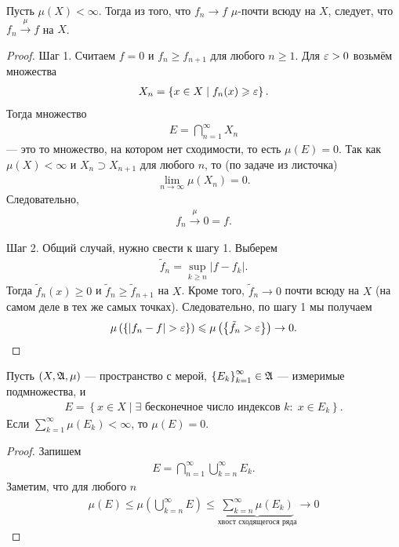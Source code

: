 \begin{thm}
 Пусть $\mu(X) < \infty$. Тогда из того, что $f_n \to f$ $\mu$-почти всюду на $X$, следует, что $f_n \xrightarrow{\mu} f$ на $X$.
\end{thm}
\begin{proof}
 Шаг 1. Считаем $f = 0$ и $f_n \geqslant f_{n+1}$ для любого $n \geqslant 1$. Для $\varepsilon > 0$ возьмём множества \begin{align*}
  X_n = \left\{ x \in X \mid f_n(x) \geqslant \varepsilon \right\}
 .\end{align*} Тогда множество \begin{align*}
  E = \bigcap_{n=1}^{\infty} X_n 
  \end{align*} --- это то множество, на котором нет сходимости, то есть $\mu(E) = 0$. Так как  $\mu(X) < \infty$ и $X_n \supset X_{n+1}$ для любого $n$, то (по задаче из листочка) \begin{align*}
  \lim_{n \to \infty} \mu(X_n)  = 0
 .\end{align*} Следовательно, \begin{align*}
 f_n \xrightarrow{\mu} 0 = f
 .\end{align*} 

 Шаг 2. Общий случай, нужно свести к шагу 1. Выберем  \begin{align*}
  \tilde f_n = \sup_{k \geqslant n} \left| f - f_k \right|
 .\end{align*} Тогда $\tilde f_n(x) \geqslant 0$ и $\tilde f_n \geqslant \tilde f_{n+1}$ на $X$. Кроме того,  $\tilde f_n \to 0$ почти всюду на $X$ (на самом деле в тех же самых точках). Следовательно, по шагу 1 мы получаем 
\begin{align*}
\mu \left( \left\{ \left| f_n - f \right| > \varepsilon \right\} \right) \leqslant \mu \left( \left\{ \tilde f_n > \varepsilon \right\} \right) \to 0
.\end{align*}
\end{proof}
\begin{lm}
 \label{lemma:borel-cantelli}
 Пусть $(X, \mathfrak{A}, \mu)$ --- пространство с мерой, $\left\{ E_k \right\}_{k=1}^{\infty} \in \mathfrak{A}$ --- измеримые подмножества, и \begin{align*}
  E = \left\{ x \in X \mid \exists \text{ бесконечное число индексов } k  \colon\; x \in E_k \right\}
 .\end{align*} Если $\sum_{k=1}^{\infty} \mu(E_k) < \infty$, то $\mu(E) = 0$.
\end{lm}
\begin{proof}
 Запишем \begin{align*}
  E = \bigcap_{n=1}^{\infty} \bigcup_{k=n}^{\infty} E_k
 .\end{align*} Заметим, что для любого $n$ \begin{align*}
 \mu(E) \leqslant \mu \left( \bigcup_{k=n}^{\infty} E \right) \leqslant \underbrace{\sum_{k=n}^{\infty} \mu(E_k)}_{\text{хвост сходящегося ряда}} \to 0
 \end{align*} 
\end{proof}
